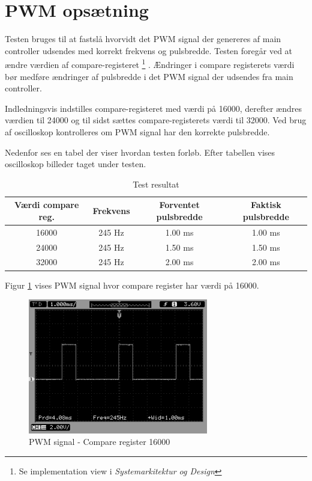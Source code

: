 \section{PWM opsætning}

Testen bruges til at fastslå hvorvidt det PWM signal der genereres af main controller udsendes med korrekt frekvens og pulsbredde. Testen foregår ved at ændre værdien af compare-registeret \footnote{Se implementation view i \textit{Systemarkitektur og Design}} . Ændringer i compare registerets værdi bør medføre ændringer af pulsbredde i det PWM signal der udsendes fra main controller. 

Indledningsvis indstilles compare-registeret med værdi på 16000, derefter ændres værdien til 24000 og til sidst sættes compare-registerets værdi til 32000. Ved brug af oscilloskop kontrolleres om PWM signal har den korrekte pulsbredde. 

Nedenfor ses en tabel der viser hvordan testen forløb. Efter tabellen vises oscilloskop billeder taget under testen. 

\vspace{0.50cm}

\begin{table}[H]
	\centering
		\begin{tabular}{|c|c|c|c|}
			\hline
			Værdi compare reg. & Frekvens & Forventet pulsbredde & Faktisk pulsbredde \\ \hline
			16000 & 245 Hz & 1.00 ms & 1.00 ms \\ \hline			
			24000 & 245 Hz & 1.50 ms & 1.50 ms \\ \hline
			32000 & 245 Hz & 2.00 ms & 2.00 ms \\ \hline
		\end{tabular}
	\caption{Test resultat}
\end{table}

\vspace{0.50cm}

Figur \ref{fig:PWM_1} vises PWM signal hvor compare register har værdi på 16000. 

\begin{figure}[H]
\centering
\includegraphics[width=0.7\textwidth]{Billeder/Test/PWM_16000.png}
\vspace{-0.0cm}
\caption{PWM signal - Compare register 16000}
\label{fig:PWM_1}
\end{figure}

